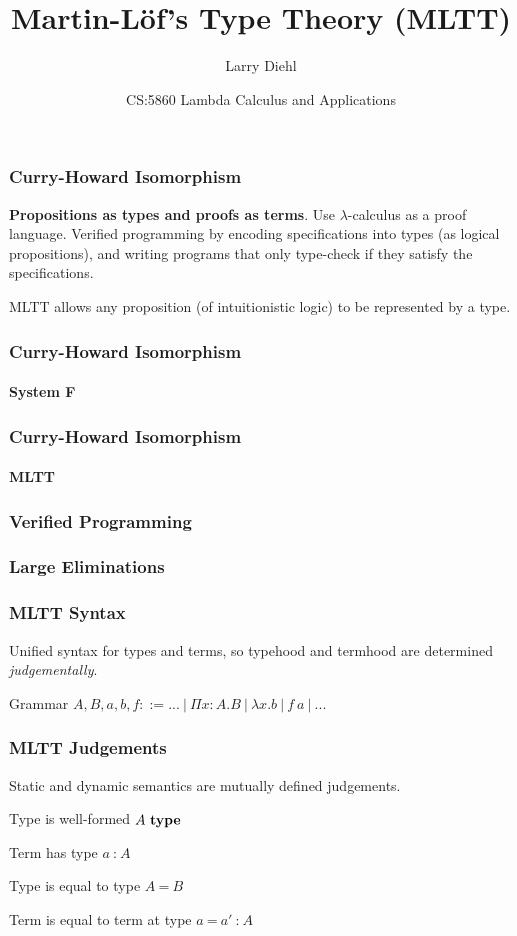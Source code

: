 \documentclass[mathserif]{beamer}
\title{Martin-L{\"o}f's Type Theory (MLTT)}
\author{Larry Diehl}
\institute{University of Iowa - Guest Lecture}
\date[April 26, 2018]
{CS:5860 Lambda Calculus and Applications}
\newcommand{\istype}[1]{\ensuremath{#1 ~\textbf{\textrm{type}}}}
\newcommand{\isterm}[2]{\ensuremath{#1 ~\textbf{{:}}~ #2}}
\newcommand{\eqtype}[2]{\ensuremath{#1 ~\textbf{=}~ #2}}
\newcommand{\eqterm}[3]{\ensuremath{#1 ~\textbf{=}~ #2 ~\textbf{{:}}~ #3}}
\newcommand{\Funv}[3]{\ensuremath{\Pi #1{:}#2. #3}}
\newcommand{\Fun}[2]{\Funv{x}{#1}{#2}}
\newcommand{\funv}[2]{\ensuremath{\lambda #1. #2}}
\newcommand{\fun}[1]{\funv{x}{#1}}
\newcommand{\app}[2]{\ensuremath{#1~#2}}
\begin{document}
\frame{\titlepage}

\begin{frame}
\frametitle{Curry-Howard Isomorphism}

\textbf{Propositions as types and proofs as terms}.
Use $\lambda$-calculus as a proof language.
Verified programming by encoding specifications
into types (as logical propositions), and
writing programs that only type-check if they
satisfy the specifications.

MLTT allows any proposition (of intuitionistic logic)
to be represented by a type.

\end{frame}


\begin{frame}
\frametitle{Curry-Howard Isomorphism}
\framesubtitle{System F}

\end{frame}

\begin{frame}
\frametitle{Curry-Howard Isomorphism}
\framesubtitle{MLTT}

\end{frame}

\begin{frame}
\frametitle{Verified Programming}

\end{frame}


\begin{frame}
\frametitle{Large Eliminations}

\end{frame}

\begin{frame}
\frametitle{MLTT Syntax}

Unified syntax for types and terms,
so typehood and termhood are determined \textit{judgementally}.

\begin{block}{Grammar}
$A,B,a,b,f ::= ...~|~\Fun{A}{B}~|~\fun{b}~|~\app{f}{a}~|~...$
\end{block}

\end{frame}


\begin{frame}
\frametitle{MLTT Judgements}

Static and dynamic semantics are mutually defined judgements.

\begin{block}{Type is well-formed}
\istype{A}
\end{block}

\begin{block}{Term has type}
\isterm{a}{A}
\end{block}

\begin{block}{Type is equal to type}
\eqtype{A}{B}
\end{block}

\begin{block}{Term is equal to term at type}
\eqterm{a}{a'}{A}
\end{block}


\end{frame}
\end{document}
